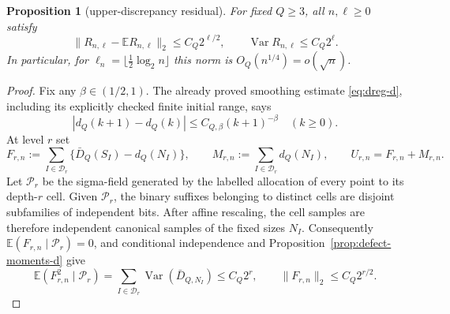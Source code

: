 \documentclass[11pt]{article}
\numberwithin{equation}{section}
\newtheorem{proposition}[theorem]{Proposition}
\newcommand{\1}{\mathbf 1}\newcommand{\F}{\mathcal F}\newcommand{\D}{\mathcal D}
\begin{document}
\begin{proposition}[upper-discrepancy residual]
\label{prop:halfres-d}
For fixed $Q\ge3$, all $n,\ell\ge0$ satisfy
\begin{equation}
 \|R_{n,\ell}-\mathbb ER_{n,\ell}\|_2\le C_Q2^{\ell/2},
 \qquad \operatorname {Var}R_{n,\ell}\le C_Q2^\ell.     \label{eq:halfres-bound-d}
\end{equation}
In particular, for
$\ell_n=\lfloor\frac12\log_2n\rfloor$ this norm is
$O_Q(n^{1/4})=o(\sqrt n)$.
\end{proposition}
\begin{proof}
Fix any $\beta\in(1/2,1)$.  The already proved smoothing estimate
\eqref{eq:dreg-d}, including its explicitly checked finite initial range,
says
\begin{equation}
 |d_Q(k+1)-d_Q(k)|\le C_{Q,\beta}(k+1)^{-\beta}\quad(k\ge0).       \label{eq:halfres-diff-d}
\end{equation}
At level $r$ set
\begin{equation}
 F_{r,n}:=\sum_{I\in\mathcal D_r}\{\bar D_Q(S_I)-d_Q(N_I)\},
 \qquad M_{r,n}:=\sum_{I\in\mathcal D_r}d_Q(N_I),
 \qquad U_{r,n}=F_{r,n}+M_{r,n}.                         \label{eq:halfres-split-d}
\end{equation}
Let $\mathcal P_r$ be the sigma-field generated by the labelled allocation
of every point to its depth-$r$ cell.  Given $\mathcal P_r$, the binary
suffixes belonging to distinct cells are disjoint subfamilies of independent
bits.  After affine rescaling, the cell samples are therefore independent
canonical samples of the fixed sizes $N_I$.  Consequently
$\mathbb E(F_{r,n}\mid\mathcal P_r)=0$, and conditional independence and
Proposition~\ref{prop:defect-moments-d} give
\begin{equation}
 \mathbb E(F_{r,n}^2\mid\mathcal P_r)
 =\sum_{I\in\mathcal D_r}\operatorname {Var}(\bar D_{Q,N_I})
 \le C_Q2^r,
 \qquad \|F_{r,n}\|_2\le C_Q2^{r/2}.                    \label{eq:halfres-fluc-d}
\end{equation}


\end{proof}
\end{document}
